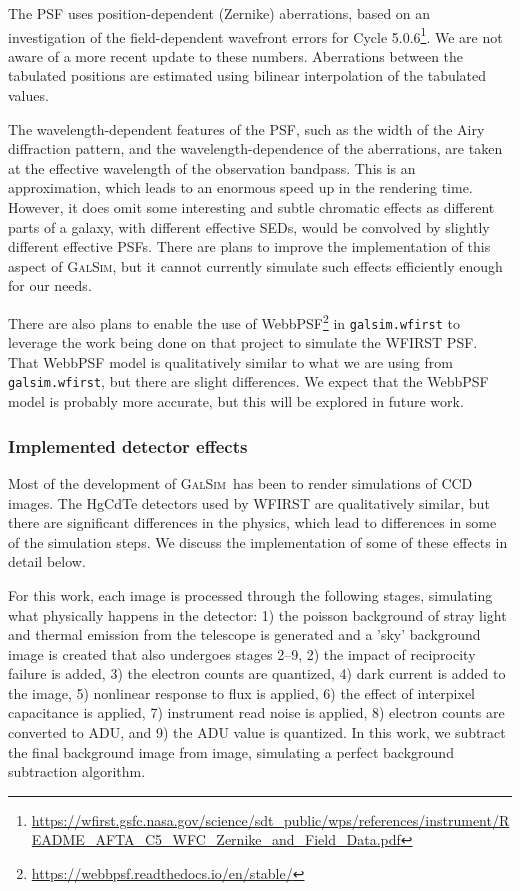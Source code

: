 \documentclass[aps,prd, amsmath,amssymb,superscriptaddress,showkeys,nofootinbib,reprint,preprintnumbers]{revtex4-1}
\newcommand{\galsim}{\textsc{GalSim}}
\begin{document}
The PSF uses position-dependent (Zernike) aberrations, based on an investigation of the field-dependent wavefront errors for Cycle 5.0.6\footnote{\url{https://wfirst.gsfc.nasa.gov/science/sdt_public/wps/references/instrument/README_AFTA_C5_WFC_Zernike_and_Field_Data.pdf}}.
We are not aware of a more recent update to these numbers. 
Aberrations between the tabulated positions are estimated using bilinear interpolation of the tabulated values.

The wavelength-dependent features of the PSF, such as the width of the Airy diffraction pattern, and the wavelength-dependence of the aberrations, are taken at the effective wavelength of the observation bandpass.
This is an approximation, which leads to an enormous speed up in the rendering time.
However, it does omit some interesting and subtle chromatic effects as different parts of a galaxy, with different effective SEDs, would be convolved by slightly different effective PSFs.
There are plans to improve the implementation of this aspect of \galsim, but it cannot currently simulate such effects efficiently enough for our needs.

There are also plans to enable the use of WebbPSF\footnote{\url{https://webbpsf.readthedocs.io/en/stable/}} in \texttt{galsim.wfirst} to leverage the work being done on that project to simulate the WFIRST PSF.
That WebbPSF model is qualitatively similar to what we are using from \texttt{galsim.wfirst}, but there are slight differences.
We expect that the WebbPSF model is probably more accurate, but this will be explored in future work.

\subsubsection{Implemented detector effects}\label{effects}

Most of the development of \galsim\ has been to render simulations of CCD images.
The HgCdTe detectors used by WFIRST are qualitatively similar, but there are significant differences in the physics, which lead to differences in some of the simulation steps. We discuss the implementation of some of these effects in detail below. 

For this work, each image is processed through the following stages, simulating what physically happens in the detector: 1) the poisson background of stray light and thermal emission from the telescope is generated and a 'sky' background image is created that also undergoes stages 2--9, 2) the impact of reciprocity failure is added, 3) the electron counts are quantized, 4) dark current is added to the image, 5) nonlinear response to flux is applied, 6) the effect of interpixel capacitance is applied, 7) instrument read noise is applied, 8) electron counts are converted to ADU, and 9) the ADU value is quantized. In this work, we subtract the final background image from image, simulating a perfect background subtraction algorithm.
\end{document}
